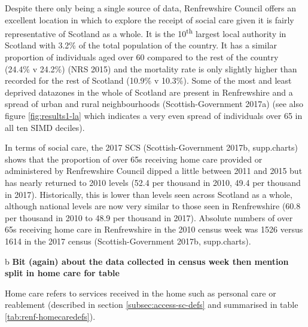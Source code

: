 \documentclass[]{article}
\begin{document}
Despite there only being a single source of data, Renfrewshire Council
offers an excellent location in which to explore the receipt of social
care given it is fairly representative of Scotland as a whole. It is the
10\textsuperscript{th} largest local authority in Scotland with 3.2\% of
the total population of the country. It has a similar proportion of
individuals aged over 60 compared to the rest of the country (24.4\% v
24.2\%) (NRS 2015) and the mortality rate is only slightly higher than
recorded for the rest of Scotland (10.9\% v 10.3\%). Some of the most
and least deprived datazones in the whole of Scotland are present in
Renfrewshire and a spread of urban and rural neighbourhoods
(Scottish-Government 2017a) (see also figure \ref{fig:results1-la} which
indicates a very even spread of individuals over 65 in all ten SIMD
deciles).

In terms of social care, the 2017 SCS (Scottish-Government 2017b,
supp.charts) shows that the proportion of over 65s receiving home care
provided or administered by Renfrewshire Council dipped a little between
2011 and 2015 but has nearly returned to 2010 levels (52.4 per thousand
in 2010, 49.4 per thousand in 2017). Historically, this is lower than
levels seen across Scotland as a whole, although national levels are now
very similar to those seen in Renfrewshire (60.8 per thousand in 2010 to
48.9 per thousand in 2017). Absolute numbers of over 65s receiving home
care in Renfrewshire in the 2010 census week was 1526 versus 1614 in the
2017 census (Scottish-Government 2017b, supp.charts).

b \textbf{Bit (again) about the data collected in census week then
mention split in home care for table}

Home care refers to services received in the home such as personal care
or reablement (described in section \ref{subsec:access-sc-defs} and
summarised in table \ref{tab:renf-homecaredefs}).

\end{document}

